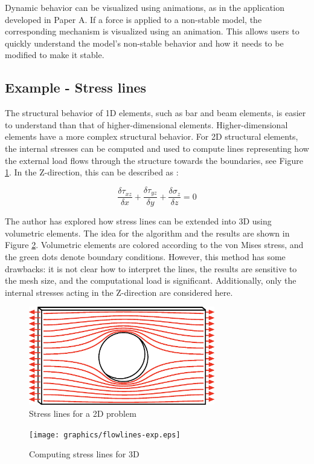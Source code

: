 Dynamic behavior can be visualized using animations, as in the application developed in Paper A. If a force is applied to a non-stable model, the corresponding mechanism is visualized using an animation. This allows users to quickly understand the model’s non-stable behavior and how it needs to be modified to make it stable. 

\subsection{Example - Stress lines}
The structural behavior of 1D elements, such as bar and beam elements, is easier to understand than that of higher-dimensional elements. Higher-dimensional elements have a more complex structural behavior. For 2D structural elements, the internal stresses can be computed and used to compute lines representing how the external load flows through the structure towards the boundaries, see Figure \ref{fig:stresslines}. In the Z-direction, this can be described as \cite{Fonseca1997}:

\begin{equation*}
\frac{\delta \tau_{xz}}{\delta x} + \frac{\delta \tau_{yz}}{\delta y} + \frac{\delta \sigma_{z}}{\delta z}= 0
\end{equation*}

The author  has explored how stress lines can be extended into 3D using volumetric elements.  The idea for the algorithm and the results are shown in Figure \ref{fig:flowlines-exp}. Volumetric elements are colored according to the von Mises stress, and the green dots denote boundary conditions. However, this method has some drawbacks: it is not clear how to interpret the lines, the results are sensitive to the mesh size, and the computational load is significant. Additionally, only the internal stresses acting in the Z-direction are considered here.

\begin{figure}
  \includegraphics[width=230pt]{graphics/stresslines.eps}
  \caption{Stress lines for a 2D problem}
  \label{fig:stresslines}
\end{figure}
 
\begin{figure}
  \texttt{[image: graphics/flowlines-exp.eps]}
  \caption{Computing stress lines for 3D}
  \label{fig:flowlines-exp}
\end{figure}
